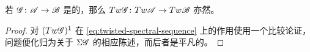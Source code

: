 \begin{lemma}\label{thm:tw-preserves-cohomologically-ff}
若 $\mathscr{G}\colon\mathscr{A}\to\mathscr{B}$ 是\trCohomology\trFullyFaithful{}的，那么
$Tw\mathscr{G}\colon Tw\mathscr{A}\to Tw\mathscr{B}$ 亦然。
\end{lemma}
\begin{proof}
对 $(Tw\mathscr{G})^1$ 在\trSpectralSequence{} \eqref{eq:twisted-spectral-sequence}
上的作用使用一个比较论证，问题便化归为关于 $\Sigma\mathscr{G}$ 的相应陈述，而后者是平凡的。
\end{proof}
